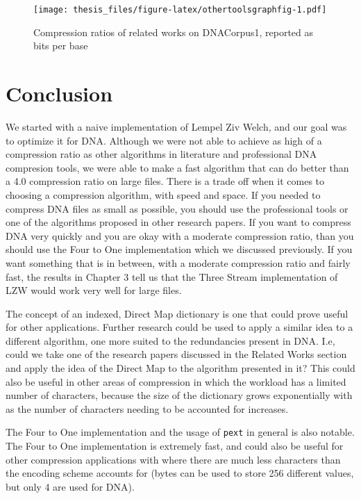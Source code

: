 \documentclass[12pt,twoside]{reedthesis}
\begin{document}
\begin{figure}
\centering
\texttt{[image: thesis\_files/figure-latex/othertoolsgraphfig-1.pdf]}
\caption{\label{fig:othertoolsgraphfig}Compression ratios of related works on DNACorpus1, reported as bits per base}
\end{figure}
\hypertarget{conclusion}{%
\chapter*{Conclusion}\label{conclusion}}

We started with a naive implementation of Lempel Ziv Welch, and our goal was to optimize it for DNA. Although we were not able to achieve as high of a compression ratio as other algorithms in literature and professional DNA compresion tools, we were able to make a fast algorithm that can do better than a 4.0 compression ratio on large files. There is a trade off when it comes to choosing a compression algorithm, with speed and space. If you needed to compress DNA files as small as possible, you should use the professional tools or one of the algorithms proposed in other research papers. If you want to compress DNA very quickly and you are okay with a moderate compression ratio, than you should use the Four to One implementation which we discussed previously. If you want something that is in between, with a moderate compression ratio and fairly fast, the results in Chapter 3 tell us that the Three Stream implementation of LZW would work very well for large files.

The concept of an indexed, Direct Map dictionary is one that could prove useful for other applications. Further research could be used to apply a similar idea to a different algorithm, one more suited to the redundancies present in DNA. I.e, could we take one of the research papers discussed in the Related Works section and apply the idea of the Direct Map to the algorithm presented in it? This could also be useful in other areas of compression in which the workload has a limited number of characters, because the size of the dictionary grows exponentially with as the number of characters needing to be accounted for increases.

The Four to One implementation and the usage of \texttt{pext} in general is also notable. The Four to One implementation is extremely fast, and could also be useful for other compression applications with where there are much less characters than the encoding scheme accounts for (bytes can be used to store 256 different values, but only 4 are used for DNA).
\end{document}
